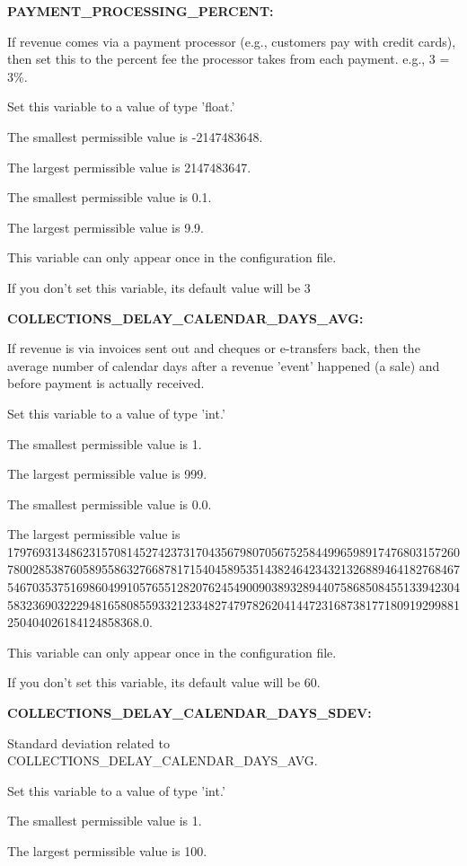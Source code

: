 \textbf{PAYMENT\_PROCESSING\_PERCENT:}


If revenue comes via a payment processor (e.g., customers pay with credit cards), then set this to the percent fee the processor takes from each payment.  e.g., 3 = 3\%.

Set this variable to a value of type 'float.'

The smallest permissible value is -2147483648.

The largest permissible value is 2147483647.

The smallest permissible value is 0.1.

The largest permissible value is 9.9.

This variable can only appear once in the configuration file.

If you don't set this variable, its default value will be 3


\textbf{COLLECTIONS\_DELAY\_CALENDAR\_DAYS\_AVG:}


If revenue is via invoices sent out and cheques or e-transfers back, then the average number of calendar days after a revenue 'event' happened (a sale) and before payment is actually received.

Set this variable to a value of type 'int.'

The smallest permissible value is 1.

The largest permissible value is 999.

The smallest permissible value is 0.0.

The largest permissible value is 179769313486231570814527423731704356798070567525844996598917476803157260780028538760589558632766878171540458953514382464234321326889464182768467546703537516986049910576551282076245490090389328944075868508455133942304583236903222948165808559332123348274797826204144723168738177180919299881250404026184124858368.0.

This variable can only appear once in the configuration file.

If you don't set this variable, its default value will be 60.


\textbf{COLLECTIONS\_DELAY\_CALENDAR\_DAYS\_SDEV:}


Standard deviation related to COLLECTIONS\_DELAY\_CALENDAR\_DAYS\_AVG.

Set this variable to a value of type 'int.'

The smallest permissible value is 1.

The largest permissible value is 100.


